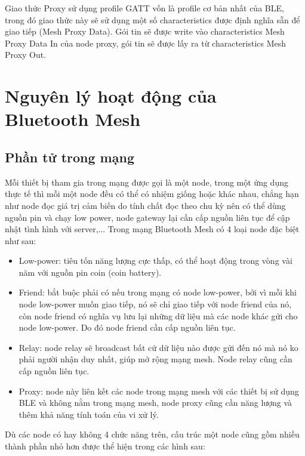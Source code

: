     Giao thức Proxy sử dụng profile GATT vốn là profile cơ bản nhất của BLE, trong đó giao thức này sẽ sử dụng một số characteristics được định nghĩa sẵn để giao tiếp (Mesh Proxy Data). Gói tin sẽ được write vào characteristics Mesh Proxy Data In của node proxy, gói tin sẽ được lấy ra từ characteristics Mesh Proxy Out.
     \section{Nguyên lý hoạt động của Bluetooth Mesh}
            \subsection{Phần tử trong mạng}
            Mỗi thiết bị tham gia trong mạng được gọi là một node, trong một ứng dụng thực tế thì mỗi một node đều có thể có nhiệm giống hoặc khác nhau, chẳng hạn như node đọc giá trị cảm biến do tính chất đọc theo chu kỳ nên có thể dùng nguồn pin và chạy low power, node gateway lại cần cấp nguồn liên tục để cập nhật tình hình với server,... Trong mạng Bluetooth Mesh có 4 loại node đặc biệt như sau:
            \begin{itemize}
                \item Low-power: tiêu tốn năng lượng cực thấp, có thể hoạt động trong vòng vài năm với nguồn pin coin (coin battery).
                \item Friend: bắt buộc phải có nếu trong mạng có node low-power, bởi vì mỗi khi node low-power muốn giao tiếp, nó sẽ chỉ giao tiếp với node friend của nó, còn node friend có nghĩa vụ lưu lại những dữ liệu mà các node khác gửi cho node low-power. Do đó node friend cần cấp nguồn liên tục.
                \item Relay: node relay sẽ broadcast bất cứ dữ liệu nào được gửi đến nó mà nó ko phải người nhận duy nhất, giúp mở rộng mạng mesh. Node relay cũng cần cấp nguồn liên tục.
                \item Proxy: node này liên kết các node trong mạng mesh với các thiết bị sử dụng BLE và không nằm trong mạng mesh, node proxy cũng cần năng lượng và thêm khả năng tính toán của vi xử lý.
            \end{itemize}
            \newpage
            Dù các node có hay không 4 chức năng trên, cấu trúc một node cũng gồm nhiều thành phần nhỏ hơn được thể hiện trong các hình sau:
